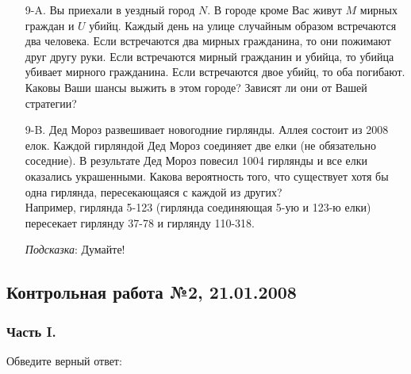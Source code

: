 \documentclass[12pt, a4paper]{article}\usepackage[]{graphicx}\usepackage[]{color}
\begin{document}
\begin{enumerate}
\item[9-A.] Вы приехали в уездный город $N$. В городе кроме Вас живут $M$ мирных граждан и $U$ убийц. Каждый день на улице случайным образом встречаются два человека. Если встречаются два мирных гражданина, то они пожимают друг другу руки. Если встречаются мирный гражданин и убийца, то убийца убивает мирного гражданина. Если встречаются двое убийц, то оба погибают. \\
Каковы Ваши шансы выжить в этом городе? Зависят ли они от Вашей стратегии?

\item[9-B.] Дед Мороз развешивает новогодние гирлянды. Аллея состоит из 2008 елок. Каждой гирляндой Дед Мороз соединяет две елки (не обязательно соседние). В результате Дед Мороз повесил 1004 гирлянды и все елки оказались украшенными. Какова вероятность того, что существует хотя бы одна гирлянда, пересекающаяся с каждой из других? \\
Например, гирлянда 5-123 (гирлянда соединяющая 5-ую и 123-ю елки) пересекает гирлянду 37-78 и гирлянду 110-318.

\emph{Подсказка}: Думайте!
\end{enumerate}

\subsection{Контрольная работа №2, 21.01.2008}

\subsubsection*{Часть I.}

Обведите верный ответ:
\end{document}
